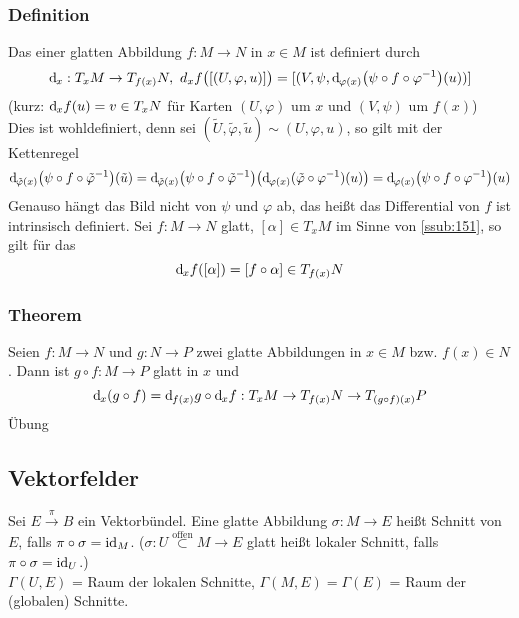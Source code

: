 \subsubsection{Definition}
\label{ssub:139}
Das  einer glatten Abbildung $f:M\to N$ in $x\in M$ ist definiert durch
\[
\mathd_x :T_x M \to T_{f(x)} N,\ d_x f \enbrace[\big]{[(U,\varphi,u)]} = [(V,\psi,\mathd_{\varphi(x)} \enbrace*{\psi \circ f \circ \varphi^{-1}}(u))]
\]
(kurz: $\mathrm{d}\mkern-1.0mu_x f(u) = v\in T_x N$ für Karten $(U,\varphi)$ um $x$ und $(V,\psi)$ um $f(x)$)\\
Dies ist wohldefiniert, denn sei $(\tilde{U},\tilde{\varphi},\tilde{u}) \sim (U,\varphi,u)$, so gilt mit der Kettenregel
\[
\mathd_{\tilde{\varphi}(x)} \enbrace*{\psi \circ f \circ \tilde{\varphi}^{-1}}\enbrace*{\tilde{u}} = 
\mathd_{\tilde{\varphi}(x)} \enbrace*{\psi \circ f \circ \tilde{\varphi}^{-1}}\enbrace*{\mathd_{\varphi(x)}(\tilde{\varphi} \circ \varphi^{-1})(u)} = 
\mathd_{\varphi(x)} \enbrace*{\psi \circ f \circ \varphi^{-1}}\enbrace*{u}
\]
Genauso hängt das Bild nicht von $\psi$ und $\varphi$ ab, das heißt das Differential von $f$ ist intrinsisch definiert.
Sei $f:M\to N$ glatt, $[\alpha]\in T_x M$ im Sinne von \ref{ssub:151}, so gilt für das 
\[
\mathrm{d}\mkern-1.0mu_x f([\alpha]) = [f\circ \alpha]\in T_{f(x)} N
\]

\subsubsection[Theorem:Kettenregel für Differentiale]{Theorem}
\label{ssub:140}
Seien $f:M\to N$ und $g:N\to P$ zwei glatte Abbildungen in $x\in M$ bzw. $f(x)\in N$. Dann ist $g\circ f: M\to P$ glatt in $x$ und 
\[
\mathrm{d}\mkern-1.0mu_x (g\circ f) = \mathrm{d}\mkern-1.0mu_{f(x)} g \circ \mathrm{d}\mkern-1.0mu_x f: T_x M \to T_{f(x)} N \to T_{(g\circ f)(x)} P
\]
Übung


\subsection{Vektorfelder}
\label{sub:17}

Sei $E \xrightarrow{\pi} B$ ein Vektorbündel. Eine glatte Abbildung $\sigma:M\to E$ heißt Schnitt von $E$, falls $\pi\circ \sigma = \operatorname{id}_M$. ($\sigma: U\overset{\text{offen}}{\subset} M \to E$ glatt heißt lokaler Schnitt, falls $\pi \circ \sigma = \operatorname{id}_U$.)\\
$\Gamma(U,E)$ = Raum der lokalen Schnitte, $\Gamma(M,E) = \Gamma(E)$ = Raum der (globalen) Schnitte.

